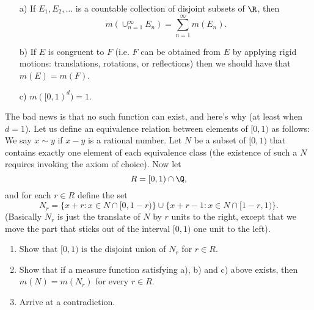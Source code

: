 \documentclass[lang=cn,11pt]{template}
\begin{document}
\begin{enumerate}
\item[a)] If $E_1, E_2, \ldots$ is a countable collection of disjoint subsets of $\R$, then 
$$
m(\cup_{n=1}^\infty E_n)=\sum_{n=1}^\infty m(E_n).
$$
\item[b)] If $E$ is congruent to $F$ (i.e. $F$ can be obtained from $E$ by applying rigid motions: translations, rotations, or reflections) then we should have that $m(E)=m(F)$.
\item[c)] $m([0,1)^d)=1$.
\end{enumerate} 

The bad news is that no such function can exist, and here's why (at least when $d=1$). Let us define an equivalence relation between elements of $[0,1)$ as follows: We say $x\sim y$ if $x-y$ is a rational number. Let $N$ be a subset of $[0,1)$ that contains exactly one element of each equivalence class (the existence of such a $N$ requires invoking the axiom of choice). Now let $$R=[0,1)\cap \Q,$$ and for each $r\in R$ define the set 
$$
N_r=\{x+r: x\in N\cap [0,1-r)\}\cup \{x+r-1: x\in N\cap [1-r, 1)\}.
$$
(Basically $N_r$ is just the translate of $N$ by $r$ units to the right, except that we move the part that sticks out of the interval $[0,1)$ one unit to the left).
\begin{enumerate}
\item Show that $[0,1)$ is the disjoint union of $N_r$ for $r\in R$.
\item Show that if a measure function satisfying a), b) and c) above exists, then $m(N)=m(N_r)$ for every $r\in R$.
\item Arrive at a contradiction.
\end{enumerate}
\end{document}
